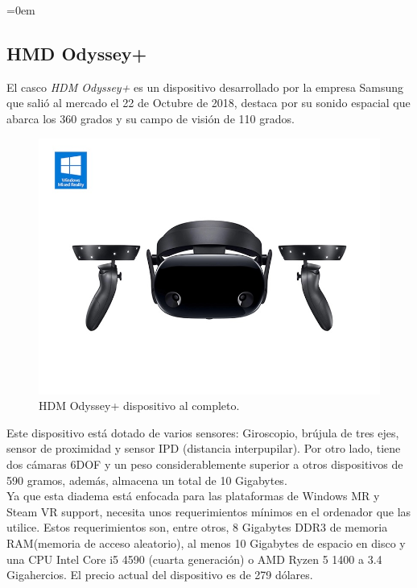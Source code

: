 \parindent=0em
\subsection{HMD Odyssey+}
\noindent


El casco \textit{HDM Odyssey+} es un dispositivo desarrollado por la empresa Samsung que salió al mercado el 22 de Octubre de 2018, destaca por su sonido espacial que abarca los 360 grados y su campo de visión de 110 grados.\\

\begin{figure}[h]
    \centering
    \includegraphics[scale=0.5]{Images/Estado del arte/samsungOdysseyplus.jpg}
    \caption{HDM Odyssey+ dispositivo al completo.}
    \label{fig:hdmOdysseyVista}
\end{figure}

Este dispositivo está dotado de varios sensores: Giroscopio, brújula de tres ejes, sensor de proximidad y sensor IPD (distancia interpupilar). Por otro lado, tiene dos cámaras 6DOF y un peso considerablemente superior a otros dispositivos de 590 gramos, además, almacena un total de 10 Gigabytes.\\

Ya que esta diadema está enfocada para las plataformas de 	Windows MR y Steam VR support, necesita unos requerimientos mínimos en el ordenador que las utilice. Estos requerimientos son, entre otros, 8 Gigabytes DDR3 de memoria RAM(memoria de acceso aleatorio), al menos 10 Gigabytes de espacio en disco y una CPU Intel Core i5 4590 (cuarta generación) o AMD Ryzen 5 1400 a 3.4 Gigahercios. El precio actual del dispositivo es de 279 dólares.



